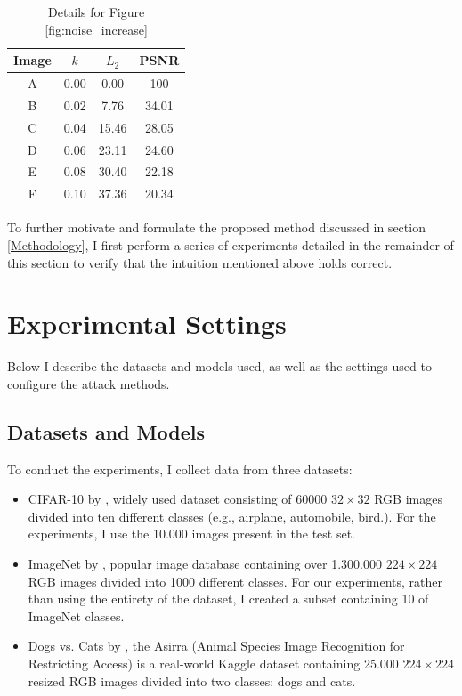 \begin{table}[!htb]
    \centering
    \begin{tabular}{|c c c c|}
        \hline
        Image & $k$  & $L_{2}$ & PSNR  \\
        \hline
        A     & 0.00 & 0.00    & 100   \\
        B     & 0.02 & 7.76    & 34.01 \\
        C     & 0.04 & 15.46   & 28.05 \\
        D     & 0.06 & 23.11   & 24.60 \\
        E     & 0.08 & 30.40   & 22.18 \\
        F     & 0.10 & 37.36   & 20.34 \\
        \hline
    \end{tabular}
    \caption{Details for Figure \ref{fig:noise_increase}}
    \label{table:noise_increase}
\end{table}


To further motivate and formulate the proposed method discussed in section
\ref{Methodology}, I first perform a series of experiments detailed in the
remainder of this section to verify that the intuition mentioned above holds
correct.

\clearpage
\section{Experimental Settings}
Below I describe the datasets and models used, as well as the settings used to
configure the attack methods.

\subsection{Datasets and Models}
\label{sub:datasets_models}

To conduct the experiments, I collect data from three datasets:
\begin{itemize}
    \item CIFAR-10 by \cite{krizhevsky_learning_2009}, widely used dataset
          consisting of 60000 $32 \times 32$ RGB images divided into ten
          different classes (e.g., airplane, automobile, bird.). For the
          experiments, I use the 10.000 images present in the test set.
    \item ImageNet by \cite{russakovsky_imagenet_2015}, popular image database
          containing over 1.300.000 $224 \times 224$ RGB images divided into
          1000 different classes. For our experiments, rather than using the
          entirety of the dataset, I created a subset containing 10 of ImageNet
          classes.
    \item Dogs vs. Cats by \cite{elson_asirra_2007}, the Asirra (Animal Species
          Image Recognition for Restricting Access) is a real-world Kaggle
          dataset containing 25.000 $224 \times 224$ resized RGB images divided
          into two classes: dogs and cats.
\end{itemize}

